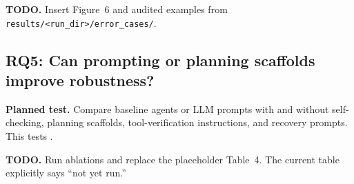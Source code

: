 \textbf{TODO.} Insert Figure~6 and audited examples from \texttt{results/<run\_dir>/error\_cases/}.

\subsection{RQ5: Can prompting or planning scaffolds improve robustness?}
\textbf{Planned test.} Compare baseline agents or LLM prompts with and without self-checking, planning scaffolds, tool-verification instructions, and recovery prompts. This tests .

\textbf{TODO.} Run ablations and replace the placeholder Table~4. The current table explicitly says ``not yet run.''
